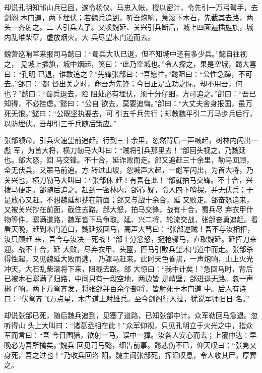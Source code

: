 却说孔明知祁山兵已回，遂令杨仪、马忠入帐，授以密计，令先引一万弓弩手，去剑阁
木门道，两下埋伏；若魏兵追到，听吾炮响，急滚下木石，先截其去路，两头一齐射之。二
人引兵去了。又唤魏延、关兴引兵断后，城上四面遍插旌旗，城内乱堆柴草，虚放烟火。大
兵尽望木门道而去。

魏营巡哨军来报司马懿曰：“蜀兵大队已退，但不知城中还有多少兵。”懿自往视之，
见城上插旗，城中烟起，笑曰：“此乃空城也。”令人探之，果是空城，懿大喜曰：“孔明
已退，谁敢追之？”先锋张郃曰：“吾愿往。”懿阻曰：“公性急躁，不可去。”郃曰：“都
督出关之时，命吾为先锋；今日正是立功之际，却不用吾，何也？”懿曰：“蜀兵退去，险
阻处必有埋伏，须十分仔细，方可追之。”郃曰：“吾已知得，不必挂虑。”懿曰：“公自
欲去，莫要追悔。”郃曰：“大丈夫舍身报国，虽万死无恨。”懿曰：“公既坚执要去，可
引五千兵先行；却教魏平引二万马步兵后行，以防埋伏。吾却引三千兵随后策应。”

张郃领命，引兵火速望前追赶。行到三十余里，忽然背后一声喊起，树林内闪出一彪
军，为首大将，横刀勒马大叫曰：“贼将引兵那里去！”郃回头视之，乃魏延也。郃大怒，回
马交锋。不十合，延诈败而走。郃又追赶三十余里，勒马回顾，全无伏兵，又策马前追。方
转过山坡，忽喊声大起，一彪军闪出，为首大将，乃关兴也，横刀勒马大叫曰：“张郃休
赶！有吾在此！”郃就拍马交锋。不十合，兴拨马便走。郃随后追之。赶到一密林内，郃心
疑，令人四下哨探，并无伏兵；于是放心又赶。不想魏延却抄在前面；郃又与战十余合，延
又败走。郃奋怒追来，又被关兴抄在前面，截住去路。郃大怒，拍马交锋，战有十合，蜀兵尽
弃衣甲什物等件，塞满道路，魏军皆下马争取。延、兴二将，轮流交战，张郃奋勇追赶。看
看天晚，赶到木门道口，魏延拨回马，高声大骂曰：“张郃逆贼！吾不与汝相拒，汝只顾赶
来，吾今与汝决一死战！”郃十分忿怒，挺枪骤马，直取魏延。延挥刀来迎。战不十合，延
大败，尽弃衣甲、头盔，匹马引败兵望木门道中而走。张郃杀得性起，又见魏延大败而逃，
乃骤马赶来。此时天色昏黑，一声炮响，山上火光冲天，大石乱柴滚将下来，阻截去路。郃
大惊曰：“我中计矣！”急回马时，背后已被木石塞满了归路，中间只有一段空地，两边皆
是峭壁，郃进退无路。忽一声梆子响，两下万弩齐发，将张郃并百余个部将，皆射死于木门道
中。后人有诗曰：“伏弩齐飞万点星，木门道上射雄兵。至今剑阁行人过，犹说军师旧日
名。”

却说张郃已死，随后魏兵追到，见塞了道路，已知张郃中计。众军勒回马急退。忽听得山
头上大叫曰：“诸葛丞相在此！”众军仰视，只见孔明立于火光之中，指众军而言曰：“吾
今日围猎，欲射一马，误中一獐。汝各人安心而去；上覆仲达：早晚必为吾所擒矣。”魏兵
回见司马懿，细告前事。懿悲伤不已，仰天叹曰：“张隽乂身死，吾之过也！”乃收兵回洛
阳。魏主闻张郃死，挥泪叹息，令人收其尸，厚葬之。

